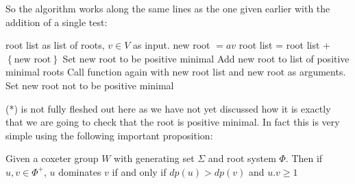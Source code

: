 \documentclass[a4paper,12pt]{article}
\begin{document}
So the algorithm works along the same lines as the one given earlier with the addition of a single test:

\begin{algorithmic}[1]
	\REQUIRE root list as list of roots, $v \in V$ as input.
		\STATE new root $= av$
			\STATE root list = root list + $\left\{\text{new root}\right\}$
		\ENDIF
			\STATE Set new root to be positive minimal
			\STATE Add new root to list of positive minimal roots
			\STATE Call function again with new root list and new root as arguments.
		\ELSE
			\STATE Set new root not to be positive minimal
		\ENDIF
	\ENDFOR
\end{algorithmic}

(*) is not fully fleshed out here as we have not yet discussed how it is exactly that we are going to check that the root is positive minimal. In fact this is very simple using the following important proposition:

\begin{prop}
	Given a coxeter group $W$ with generating set $\Sigma$ and root system $\Phi$. Then if $u,v \in \Phi^+$, $u$ dominates $v$ if and only if $dp(u) > dp(v)$ and $u.v \geq 1$
\end{prop}
\end{document}
